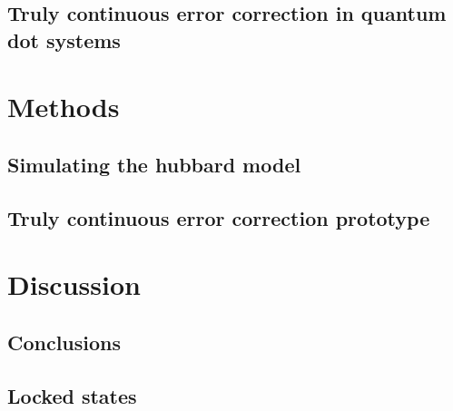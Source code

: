 \documentclass{report}
\begin{document}
\section{Truly continuous error correction in quantum dot systems}

\chapter{Methods}

\section{Simulating the hubbard model}

\section{Truly continuous error correction prototype}

\chapter {Discussion}

\section{Conclusions}

\printbibliography

\begin{appendices}
\chapter{Locked states}
\end{appendices}
\end{document}
